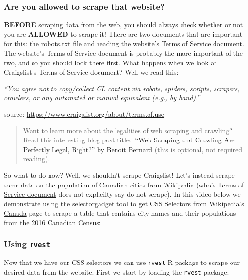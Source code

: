 \documentclass[
]{article}
\begin{document}
\hypertarget{are-you-allowed-to-scrape-that-website}{%
\subsubsection{Are you allowed to scrape that
website?}\label{are-you-allowed-to-scrape-that-website}}

\textbf{BEFORE} scraping data from the web, you should always check
whether or not you are \textbf{ALLOWED} to scrape it! There are two
documents that are important for this: the robots.txt file and reading
the website's Terms of Service document. The website's Terms of Service
document is probably the more important of the two, and so you should
look there first. What happens when we look at Craigslist's Terms of
Service document? Well we read this:

\emph{``You agree not to copy/collect CL content via robots, spiders,
scripts, scrapers, crawlers, or any automated or manual equivalent
(e.g., by hand).''}

source: \url{https://www.craigslist.org/about/terms.of.use}

\begin{quote}
Want to learn more about the legalities of web scraping and crawling?
Read this interesting blog post titled
\href{https://benbernardblog.com/web-scraping-and-crawling-are-perfectly-legal-right/}{``Web
Scraping and Crawling Are Perfectly Legal, Right?'' by Benoit Bernard}
(this is optional, not required reading).
\end{quote}

So what to do now? Well, we shouldn't scrape Craigslist! Let's instead
scrape some data on the population of Canadian cities from Wikipedia
(who's
\href{https://foundation.wikimedia.org/wiki/Terms_of_Use/en}{Terms of
Service document} does not explicilty say do not scrape). In this video
below we demonstrate using the selectorgadget tool to get CSS Selectors
from \href{https://en.wikipedia.org/wiki/Canada}{Wikipedia's Canada}
page to scrape a table that contains city names and their populations
from the 2016 Canadian Census:

\hypertarget{using-rvest}{%
\subsubsection{\texorpdfstring{Using
\texttt{rvest}}{Using rvest}}\label{using-rvest}}

Now that we have our CSS selectors we can use \texttt{rvest} R package
to scrape our desired data from the website. First we start by loading
the \texttt{rvest} package:
\end{document}
